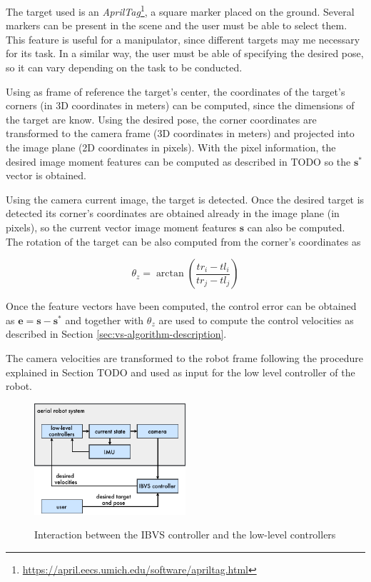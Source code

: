 The target used is an \emph{AprilTag}\footnote{\url{https://april.eecs.umich.edu/software/apriltag.html}}, a square marker placed on the ground. Several markers can be present in the scene and the user must be able to select them. This feature is useful for a manipulator, since different targets may me necessary for its task. In a similar way, the user must be able of specifying the desired pose, so it can vary depending on the task to be conducted.

Using as frame of reference the target's center, the coordinates of the target's corners (in 3D coordinates in meters) can be computed, since the dimensions of the target are know. Using the desired pose, the corner coordinates are transformed to the camera frame (3D coordinates in meters) and projected into the image plane (2D coordinates in pixels). With the pixel information, the desired image moment features can be computed as described in TODO so the $\bm{s}^\ast$ vector is obtained.
 
Using the camera current image, the target is detected. Once the desired target is detected its corner's coordinates are obtained already in the image plane (in pixels), so the current vector image moment features $\bm{s}$ can also be computed. The rotation of the target can be also computed from the corner's coordinates as

\begin{equation}
 \theta_z = \arctan \left( \frac{tr_i - tl_i}{tr_j - tl_j} \right) 
\end{equation}
 
 Once the feature vectors have been computed, the control error can be obtained as $\bm{e} = \bm{s} - \bm{s}^\ast$ and together with $\theta_z$ are used to compute the control velocities as described in Section \ref{sec:vs-algorithm-description}.
 
 The camera velocities are transformed to the robot frame following the procedure explained in Section TODO and used as input for the low level controller of the robot. 
	
\begin{figure}[!htb]
		\caption{Interaction between the IBVS controller and the low-level controllers}
	\centering
	\includegraphics[width=0.5\textwidth]{content/chapter_04/images/context_diagram.pdf}
	\label{fig:low-level-ibvs}
\end{figure}

